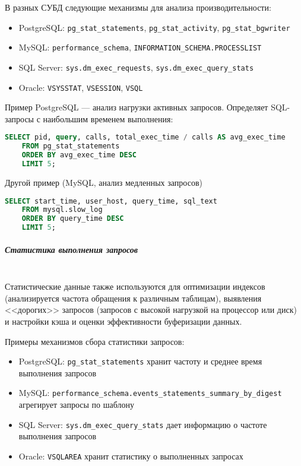 В разных СУБД следующие механизмы для анализа производительности:
\begin{itemize}
    \item PostgreSQL: \texttt{pg\_stat\_statements}, \texttt{pg\_stat\_activity}, \texttt{pg\_stat\_bgwriter} \autocite[§27.2]{PostgreSQLdocc27}
    \item MySQL: \texttt{performance\_schema}, \texttt{INFORMATION\_SCHEMA.PROCESSLIST} \autocite{Mysqldoc2}
    \item SQL Server: \texttt{sys.dm\_exec\_requests}, \texttt{sys.dm\_exec\_query\_stats} \autocite{MicrosoftLearnSQLserverSysDymView}
    \item Oracle: \texttt{V\textdollar SYSSTAT}, \texttt{V\textdollar SESSION}, \texttt{V\textdollar SQL} \autocite[c. 9 §9.98, §9.17, §9.46]{oracledbdoc2}
\end{itemize}

Пример PostgreSQL — анализ нагрузки активных запросов. Определяет SQL-запросы с наибольшим временем выполнения:
\begin{lstlisting}[language=SQL]
    SELECT pid, query, calls, total_exec_time / calls AS avg_exec_time
    FROM pg_stat_statements
    ORDER BY avg_exec_time DESC
    LIMIT 5;        
\end{lstlisting}

Другой пример (MySQL, анализ медленных запросов)
\begin{lstlisting}[language=SQL]
    SELECT start_time, user_host, query_time, sql_text
    FROM mysql.slow_log
    ORDER BY query_time DESC
    LIMIT 5;        
\end{lstlisting}

\subparagraph{Статистика выполнения запросов} ~\\

Статистические данные также используются для оптимизации индексов (анализируется частота обращения к различным таблицам), выявления <<дорогих>> запросов (запросов с высокой нагрузкой на процессор или диск) и настройки кэша и оценки эффективности буферизации данных.

Примеры механизмов сбора статистики запросов:
\begin{itemize}
    \item PostgreSQL: \texttt{pg\_stat\_statements} хранит частоту и среднее время выполнения запросов
    \item MySQL: \texttt{performance\_schema.events\_statements\_summary\_by\_digest} агрегирует запросы по шаблону
    \item SQL Server: \texttt{sys.dm\_exec\_query\_stats} дает информацию о частоте выполнения запросов
    \item Oracle: \texttt{V\textdollar SQLAREA} хранит статистику о выполненных запросах
\end{itemize}

